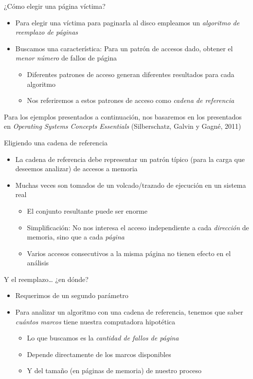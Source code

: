 \documentclass[presentation]{beamer}
\begin{document}
\begin{frame}[label={sec:org1e90f14}]{¿Cómo elegir una página víctima?}
\begin{itemize}
\item Para elegir una víctima para paginarla al disco empleamos un
\emph{algoritmo de reemplazo de páginas}
\item Buscamos una característica: Para un patrón de accesos dado, obtener
el \emph{menor número} de fallos de página
\begin{itemize}
\item Diferentes patrones de acceso generan diferentes resultados para
cada algoritmo
\item Nos referiremos a estos patrones de acceso como \emph{cadena de
referencia}
\end{itemize}
\end{itemize}
\begin{center}
Para los ejemplos presentados a continuación, nos basaremos en los
presentados en \emph{Operating Systems Concepts Essentials} (Silberschatz,
Galvin y Gagné, 2011)
\end{center}
\end{frame}

\begin{frame}[label={sec:orgb027d73}]{Eligiendo una cadena de referencia}
\begin{itemize}
\item La cadena de referencia debe representar un patrón típico (para la
carga que deseemos analizar) de accesos a memoria
\item Muchas veces son tomados de un volcado/trazado de ejecución en un
sistema real
\begin{itemize}
\item El conjunto resultante puede ser enorme
\item Simplificación: No nos interesa el acceso independiente a cada
\emph{dirección} de memoria, sino que a cada \emph{página}
\item Varios accesos consecutivos a la misma página no tienen efecto en
el análisis
\end{itemize}
\end{itemize}
\end{frame}

\begin{frame}[label={sec:orgc806f9e}]{Y el reemplazo\ldots{} ¿en dónde?}
\begin{itemize}
\item Requerimos de un segundo parámetro
\item Para analizar un algoritmo con una cadena de referencia, tenemos que
saber \emph{cuántos marcos} tiene nuestra computadora hipotética
\begin{itemize}
\item Lo que buscamos es la \emph{cantidad de fallos de página}
\item Depende directamente de los marcos disponibles
\item Y del tamaño (en páginas de memoria) de nuestro proceso
\end{itemize}
\end{itemize}
\end{frame}
\end{document}
